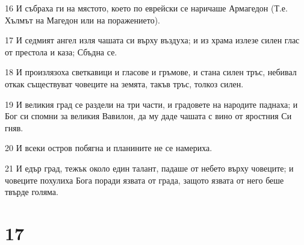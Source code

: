 \par 16 И събраха ги на мястото, което по еврейски се наричаше Армагедон (Т.е. Хълмът на Магедон или на поражението).
\par 17 И седмият ангел изля чашата си върху въздуха; и из храма излезе силен глас от престола и каза; Сбъдна се.
\par 18 И произлязоха светкавици и гласове и гръмове, и стана силен тръс, небивал откак съществуват човеците на земята, такъв тръс, толкоз силен.
\par 19 И великия град се раздели на три части, и градовете на народите паднаха; и Бог си спомни за великия Вавилон, да му даде чашата с вино от яростния Си гняв.
\par 20 И всеки остров побягна и планините не се намериха.
\par 21 И едър град, тежък около един талант, падаше от небето върху човеците; и човеците похулиха Бога поради язвата от града, защото язвата от него беше твърде голяма.

\chapter{17}

